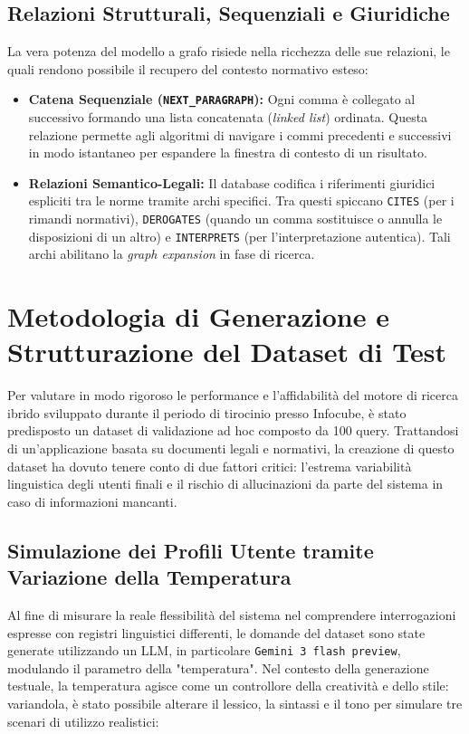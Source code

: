 \subsection{Relazioni Strutturali, Sequenziali e Giuridiche}
La vera potenza del modello a grafo risiede nella ricchezza delle sue relazioni, le quali rendono possibile il recupero del contesto normativo esteso:
\begin{itemize}
    \item \textbf{Catena Sequenziale (\texttt{NEXT\_PARAGRAPH}):} Ogni comma è collegato al successivo formando una lista concatenata (\textit{linked list}) ordinata. Questa relazione permette agli algoritmi di navigare i commi precedenti e successivi in modo istantaneo per espandere la finestra di contesto di un risultato.
    \item \textbf{Relazioni Semantico-Legali:} Il database codifica i riferimenti giuridici espliciti tra le norme tramite archi specifici. Tra questi spiccano \texttt{CITES} (per i rimandi normativi), \texttt{DEROGATES} (quando un comma sostituisce o annulla le disposizioni di un altro) e \texttt{INTERPRETS} (per l'interpretazione autentica). Tali archi abilitano la \textit{graph expansion} in fase di ricerca.
\end{itemize}

\section{Metodologia di Generazione e Strutturazione del Dataset di Test}

Per valutare in modo rigoroso le performance e l'affidabilità del motore di ricerca ibrido sviluppato durante il periodo di tirocinio presso Infocube, è stato predisposto un dataset di validazione ad hoc composto da 100 query. Trattandosi di un'applicazione basata su documenti legali e normativi, la creazione di questo dataset ha dovuto tenere conto di due fattori critici: l'estrema variabilità linguistica degli utenti finali e il rischio di allucinazioni da parte del sistema in caso di informazioni mancanti.

\subsection{Simulazione dei Profili Utente tramite Variazione della Temperatura}
Al fine di misurare la reale flessibilità del sistema nel comprendere interrogazioni espresse con registri linguistici differenti, le domande del dataset sono state generate utilizzando un LLM, in particolare \texttt{Gemini 3 flash preview}, modulando il parametro della "temperatura". Nel contesto della generazione testuale, la temperatura agisce come un controllore della creatività e dello stile: variandola, è stato possibile alterare il lessico, la sintassi e il tono per simulare tre scenari di utilizzo realistici:


